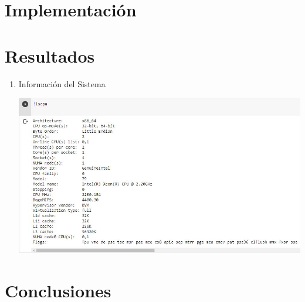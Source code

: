 \documentclass{article}
\begin{document}
\section{Implementación}

\section{Resultados}

    \begin{enumerate}
        \item Información del Sistema
        
        \includegraphics[width=\textwidth]{img/Captura1}
        
    \end{enumerate}

\section{Conclusiones}
	
		
	
\end{document}
